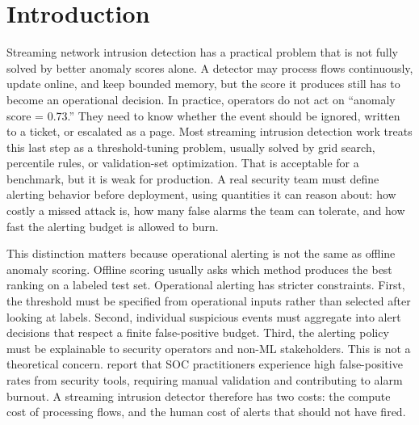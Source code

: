 \documentclass[preprint,12pt,authoryear]{elsarticle}
\begin{document}
\section{Introduction}
\label{sec:intro}

Streaming network intrusion detection has a practical problem that is not fully solved by better anomaly scores alone. A detector may process flows continuously, update online, and keep bounded memory, but the score it produces still has to become an operational decision. In practice, operators do not act on ``anomaly score = 0.73.'' They need to know whether the event should be ignored, written to a ticket, or escalated as a page. Most streaming intrusion detection work treats this last step as a threshold-tuning problem, usually solved by grid search, percentile rules, or validation-set optimization. That is acceptable for a benchmark, but it is weak for production. A real security team must define alerting behavior before deployment, using quantities it can reason about: how costly a missed attack is, how many false alarms the team can tolerate, and how fast the alerting budget is allowed to burn.

This distinction matters because operational alerting is not the same as offline anomaly scoring. Offline scoring usually asks which method produces the best ranking on a labeled test set. Operational alerting has stricter constraints. First, the threshold must be specified from operational inputs rather than selected after looking at labels. Second, individual suspicious events must aggregate into alert decisions that respect a finite false-positive budget. Third, the alerting policy must be explainable to security operators and non-ML stakeholders. This is not a theoretical concern. \citet{alahmadi2022falsepositives} report that SOC practitioners experience high false-positive rates from security tools, requiring manual validation and contributing to alarm burnout. A streaming intrusion detector therefore has two costs: the compute cost of processing flows, and the human cost of alerts that should not have fired.
\end{document}
